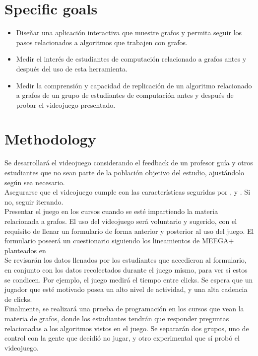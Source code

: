 \documentclass[submission]{eptcs}
\begin{document}
\section{Specific goals}

\begin{itemize}
\item Diseñar una aplicación interactiva que muestre grafos y permita seguir
los pasos relacionados a algoritmos que trabajen con grafos.

\item Medir el interés de estudiantes de computación relacionado a grafos
antes y después del uso de esta herramienta.

\item Medir la comprensión y capacidad de replicación de un algoritmo relacionado a grafos
de un grupo de estudiantes de computación antes y después de probar el videojuego presentado.

\end{itemize}

\section{Methodology}

Se desarrollará el videojuego considerando el feedback de un profesor guía y otros estudiantes
que no sean parte de la población objetivo del estudio, ajustándolo según sea necesario. \\
Asegurarse que el videojuego cumple con las características seguridas por \cite{evaluation_of_games_for_teaching_cs},
\cite{petri2018method} y \cite{using_videogames_maths}. Si no, seguir iterando. \\
Presentar el juego en los cursos cuando se esté impartiendo la materia relacionada a grafos. El uso del
videojuego será voluntario y sugerido, con el requisito de llenar un formulario de forma anterior y posterior al uso del juego.
El formulario poseerá un cuestionario siguiendo los lineamientos de MEEGA+ planteados en \cite{petri2018meegaplus} \\
Se revisarán los datos llenados por los estudiantes que accedieron al formulario, en conjunto con los
datos recolectados durante el juego mismo, para ver si estos se condicen. Por ejemplo, el juego medirá el tiempo
entre clicks. Se espera que un jugador que esté motivado posea un alto nivel de actividad, y una alta cadencia de clicks. \\
Finalmente, se realizará una prueba de programación en los cursos que vean la materia de grafos, donde los estudiantes
tendrán que responder preguntas relacionadas a los algoritmos vistos en el juego. Se separarán dos grupos, 
uno de control con la gente que decidió no jugar, y otro experimental que sí probó el videojuego.
\end{document}
